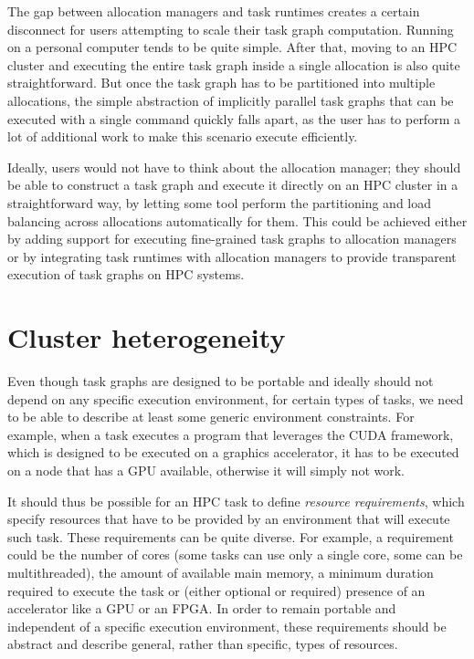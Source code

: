 \vspace{5mm}
The gap between allocation managers and task runtimes creates a certain disconnect for users
attempting to scale their task graph computation. Running on a personal computer tends to be quite
simple. After that, moving to an HPC cluster and executing the entire task graph inside a single
allocation is also quite straightforward. But once the task graph has to be partitioned into
multiple allocations, the simple abstraction of implicitly parallel task graphs that can be
executed with a single command quickly falls apart, as the user has to perform a lot of additional
work to make this scenario execute efficiently.

Ideally, users would not have to think about the allocation manager; they should be able to
construct a task graph and execute it directly on an HPC cluster in a straightforward way, by
letting some tool perform the partitioning and load balancing across allocations automatically for
them. This could be achieved either by adding support for executing fine-grained task graphs to
allocation managers or by integrating task runtimes with allocation managers to provide transparent
execution of task graphs on HPC systems.

\section{Cluster heterogeneity}
Even though task graphs are designed to be portable and ideally should not depend on any specific
execution environment, for certain types of tasks, we need to be able to describe at least some
generic environment constraints. For example, when a task executes a program that leverages the
CUDA framework, which is designed to be executed on a graphics
accelerator, it has to be executed on a node that has a GPU available, otherwise it will simply not
work.

It should thus be possible for an HPC task to define \emph{resource requirements}, which specify
resources that have to be provided by an environment that will execute such task. These
requirements can be quite diverse. For example, a requirement could be the number of cores (some
tasks can use only a single core, some can be multithreaded), the amount of available main memory,
a minimum duration required to execute the task or (either optional or required) presence of an
accelerator like a GPU or an FPGA\@. In order to remain portable and independent of a specific
execution environment, these requirements should be abstract and describe general, rather than
specific, types of resources.

